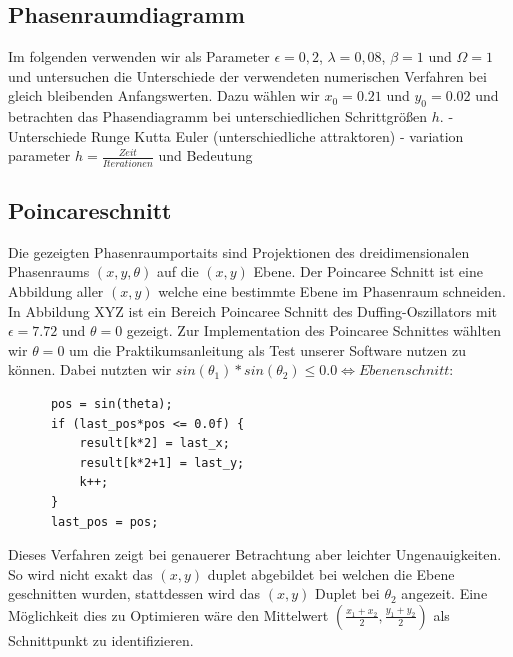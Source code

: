 \documentclass{scrartcl}
\begin{document}
\subsection { Phasenraumdiagramm }
Im folgenden verwenden wir als Parameter $\epsilon = 0,2$, $\lambda = 0,08$, $\beta = 1$ und $\Omega = 1$ und untersuchen die Unterschiede der verwendeten numerischen Verfahren bei gleich bleibenden Anfangswerten. Dazu wählen wir $x_0=0.21$ und $y_0=0.02$ und betrachten das Phasendiagramm bei unterschiedlichen Schrittgrößen $h$.
\newline
- Unterschiede Runge Kutta Euler (unterschiedliche attraktoren)
\newline
- variation parameter $h = \frac{Zeit}{Iterationen}$ und Bedeutung
\subsection{ Poincareschnitt }
Die gezeigten Phasenraumportaits sind Projektionen des dreidimensionalen Phasenraums $(x,y,\theta)$ auf die $(x,y)$ Ebene. Der Poincaree Schnitt ist eine Abbildung aller $(x,y)$ welche eine bestimmte Ebene im Phasenraum schneiden. In Abbildung XYZ ist ein Bereich Poincaree Schnitt des Duffing-Oszillators mit $\epsilon=7.72$ und $\theta=0$ gezeigt. Zur Implementation des Poincaree Schnittes wählten wir $\theta=0$ um die Praktikumsanleitung als Test unserer Software nutzen zu können. Dabei nutzten wir $sin(\theta_1)*sin(\theta_2) \leq 0.0 \iff Ebenenschnitt$:
\begin{lstlisting}
      pos = sin(theta);
      if (last_pos*pos <= 0.0f) {
          result[k*2] = last_x;
          result[k*2+1] = last_y;
          k++;
      }
      last_pos = pos;

\end{lstlisting}
Dieses Verfahren zeigt bei genauerer Betrachtung aber leichter Ungenauigkeiten. So wird nicht exakt das $(x,y)$ duplet abgebildet bei welchen die Ebene geschnitten wurden, stattdessen wird das $(x,y)$ Duplet bei $\theta_2$ angezeit. Eine Möglichkeit dies zu Optimieren wäre den Mittelwert $(\frac{x_1+x_2}{2}, \frac{y_1 + y_2}{2})$ als Schnittpunkt zu identifizieren.
\end{document}
